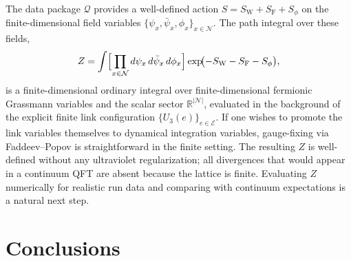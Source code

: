 \documentclass[11pt]{article}
\theoremstyle{remark}
\newcommand{\R}{\mathbb R}
\newcommand{\mcN}{\mathcal N}
\newcommand{\mcE}{\mathcal E}
\begin{document}
The data package $\mathcal Q$ provides a well-defined action
$S=S_{\mathrm W}+S_{\mathrm F}+S_\phi$
on the finite-dimensional field variables
$\{\psi_x,\bar\psi_x,\phi_x\}_{x\in\mcN}$.
The path integral over these fields,
\[
Z=\int \Bigl[\prod_{x\in\mcN}d\psi_x\,d\bar\psi_x\,d\phi_x\Bigr]
\exp\!\bigl(-S_{\mathrm W}-S_{\mathrm F}-S_\phi\bigr),
\]
is a finite-dimensional ordinary integral over finite-dimensional fermionic
Grassmann variables and the scalar sector $\R^{|\mcN|}$, evaluated in the
background of the explicit finite link configuration $\{U_3(e)\}_{e\in\mcE}$.
If one wishes to promote the link variables themselves to dynamical integration
variables, gauge-fixing via Faddeev--Popov is straightforward in the finite
setting.
The resulting $Z$ is well-defined without any ultraviolet regularization;
all divergences that would appear in a continuum QFT are absent because the
lattice is finite.
Evaluating $Z$ numerically for realistic run data and comparing with continuum
expectations is a natural next step.

\section{Conclusions}
\label{sec:conclusions}
\end{document}
